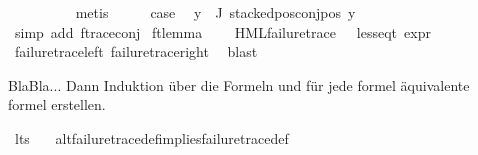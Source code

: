 \begin{isabellebody}
\ \ \ \ \ \ \ \ \isamarkupfalse%
\ metis\isanewline
\ \ \isamarkupfalse%
\ \isamarkupfalse%
\ {\isacharquery}{\kern0pt}case\ \isamarkupfalse%
\ {\isacartoucheopen}{\isasymforall}y{\isasymin}{\isasymPhi}\ {\isacharbackquote}{\kern0pt}\ J{\isachardot}{\kern0pt}\ stacked{\isacharunderscore}{\kern0pt}pos{\isacharunderscore}{\kern0pt}conj{\isacharunderscore}{\kern0pt}pos\ y{\isacartoucheclose}\isanewline
\ \ \ \ \isamarkupfalse%
\ {\isacharparenleft}{\kern0pt}simp\ add{\isacharcolon}{\kern0pt}\ f{\isacharunderscore}{\kern0pt}trace{\isacharunderscore}{\kern0pt}conj{\isacharparenright}{\kern0pt}\isanewline
{}\isamarkupfalse%
%
\endisatagproof
{\isafoldproof}%
%
\isadelimproof
\isanewline
%
\endisadelimproof
\isanewline
{}\isamarkupfalse%
\ ft{\isacharunderscore}{\kern0pt}lemma{\isacharcolon}{\kern0pt}\ \isanewline
\ \ \ {\isachardoublequoteopen}{\isacharparenleft}{\kern0pt}HML{\isacharunderscore}{\kern0pt}failure{\isacharunderscore}{\kern0pt}trace\ {\isasymphi}{\isacharparenright}{\kern0pt}\ {\isacharequal}{\kern0pt}\ {\isacharparenleft}{\kern0pt}less{\isacharunderscore}{\kern0pt}eq{\isacharunderscore}{\kern0pt}t\ {\isacharparenleft}{\kern0pt}expr\ {\isasymphi}{\isacharparenright}{\kern0pt}\ {\isacharparenleft}{\kern0pt}{\isasyminfinity}{\isacharcomma}{\kern0pt}\ {\isasyminfinity}{\isacharcomma}{\kern0pt}\ {\isasyminfinity}{\isacharcomma}{\kern0pt}\ {}{\isacharcomma}{\kern0pt}\ {}{\isacharcomma}{\kern0pt}\ {}{\isacharparenright}{\kern0pt}{\isacharparenright}{\kern0pt}{\isachardoublequoteclose}\ \isanewline
%
\isadelimproof
\ \ %
\endisadelimproof
%
\isatagproof
{}\isamarkupfalse%
\ failure{\isacharunderscore}{\kern0pt}trace{\isacharunderscore}{\kern0pt}left\ failure{\isacharunderscore}{\kern0pt}trace{\isacharunderscore}{\kern0pt}right\ \isamarkupfalse%
\ blast%
\endisatagproof
{\isafoldproof}%
%
\isadelimproof
%
\endisadelimproof
%
\begin{isamarkuptext}%
BlaBla... Dann Induktion über die Formeln und für jede formel äquivalente formel erstellen.%
\end{isamarkuptext}\isamarkuptrue%
\isamarkupfalse%
\ lts\ \isanewline
{}\isamarkupfalse%
\ \ alt{\isacharunderscore}{\kern0pt}failure{\isacharunderscore}{\kern0pt}trace{\isacharunderscore}{\kern0pt}def{\isacharunderscore}{\kern0pt}implies{\isacharunderscore}{\kern0pt}failure{\isacharunderscore}{\kern0pt}trace{\isacharunderscore}{\kern0pt}def{\isacharcolon}{\kern0pt}\isanewline

\end{isabellebody}
